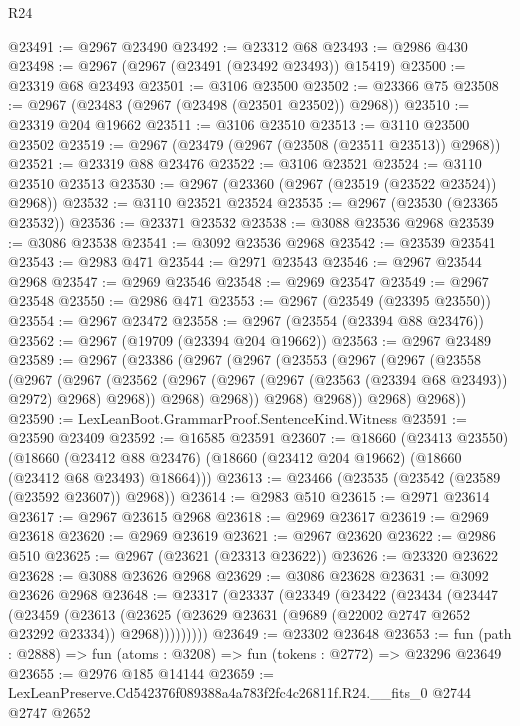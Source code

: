 \begin{lexlean}{R24}
\begin{coremodule}
@23491 := @2967 @23490
@23492 := @23312 @68
@23493 := @2986 @430
@23498 := @2967 (@2967 (@23491 (@23492 @23493)) @15419)
@23500 := @23319 @68 @23493
@23501 := @3106 @23500
@23502 := @23366 @75
@23508 := @2967 (@23483 (@2967 (@23498 (@23501 @23502)) @2968))
@23510 := @23319 @204 @19662
@23511 := @3106 @23510
@23513 := @3110 @23500 @23502
@23519 := @2967 (@23479 (@2967 (@23508 (@23511 @23513)) @2968))
@23521 := @23319 @88 @23476
@23522 := @3106 @23521
@23524 := @3110 @23510 @23513
@23530 := @2967 (@23360 (@2967 (@23519 (@23522 @23524)) @2968))
@23532 := @3110 @23521 @23524
@23535 := @2967 (@23530 (@23365 @23532))
@23536 := @23371 @23532
@23538 := @3088 @23536 @2968
@23539 := @3086 @23538
@23541 := @3092 @23536 @2968
@23542 := @23539 @23541
@23543 := @2983 @471
@23544 := @2971 @23543
@23546 := @2967 @23544 @2968
@23547 := @2969 @23546
@23548 := @2969 @23547
@23549 := @2967 @23548
@23550 := @2986 @471
@23553 := @2967 (@23549 (@23395 @23550))
@23554 := @2967 @23472
@23558 := @2967 (@23554 (@23394 @88 @23476))
@23562 := @2967 (@19709 (@23394 @204 @19662))
@23563 := @2967 @23489
@23589 := @2967
    (@23386
      (@2967
        (@2967
          (@23553
            (@2967
              (@2967
                (@23558
                  (@2967
                    (@2967
                      (@23562
                        (@2967 (@2967 (@2967 (@23563 (@23394 @68 @23493)) @2972) @2968) @2968))
                      @2968)
                    @2968))
                @2968)
              @2968))
          @2968)
        @2968))
@23590 := LexLeanBoot.GrammarProof.SentenceKind.Witness
@23591 := @23590 @23409
@23592 := @16585 @23591
@23607 := @18660
    (@23413 @23550)
    (@18660 (@23412 @88 @23476) (@18660 (@23412 @204 @19662) (@18660 (@23412 @68 @23493) @18664)))
@23613 := @23466 (@23535 (@23542 (@23589 (@23592 @23607)) @2968))
@23614 := @2983 @510
@23615 := @2971 @23614
@23617 := @2967 @23615 @2968
@23618 := @2969 @23617
@23619 := @2969 @23618
@23620 := @2969 @23619
@23621 := @2967 @23620
@23622 := @2986 @510
@23625 := @2967 (@23621 (@23313 @23622))
@23626 := @23320 @23622
@23628 := @3088 @23626 @2968
@23629 := @3086 @23628
@23631 := @3092 @23626 @2968
@23648 := @23317
    (@23337
      (@23349
        (@23422
          (@23434
            (@23447
              (@23459
                (@23613
                  (@23625 (@23629 @23631 (@9689 (@22002 @2747 @2652 @23292 @23334)) @2968)))))))))
@23649 := @23302 @23648
@23653 := fun (path : @2888) => fun (atoms : @3208) => fun (tokens : @2772) => @23296 @23649
@23655 := @2976 @185 @14144
@23659 := LexLeanPreserve.Cd542376f089388a4a783f2fc4c26811f.R24.__fits_0 @2744 @2747 @2652

\end{coremodule}
\end{lexlean}
